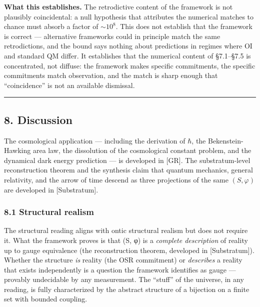 \documentclass[
]{article}
\begin{document}
\textbf{What this establishes.} The retrodictive content of the
framework is not plausibly coincidental: a null hypothesis that
attributes the numerical matches to chance must absorb a factor of
\(\sim 10^8\). This does not establish that the framework is correct ---
alternative frameworks could in principle match the same retrodictions,
and the bound says nothing about predictions in regimes where OI and
standard QM differ. It establishes that the numerical content of
§7.1--§7.5 is concentrated, not diffuse: the framework makes specific
commitments, the specific commitments match observation, and the match
is sharp enough that ``coincidence'' is not an available dismissal.

\begin{center}\rule{0.5\linewidth}{0.5pt}\end{center}

\hypertarget{discussion}{%
\subsection{8. Discussion}\label{discussion}}

The cosmological application --- including the derivation of \(\hbar\),
the Bekenstein-Hawking area law, the dissolution of the cosmological
constant problem, and the dynamical dark energy prediction --- is
developed in {[}GR{]}. The substratum-level reconstruction theorem and
the synthesis claim that quantum mechanics, general relativity, and the
arrow of time descend as three projections of the same \((S, \varphi)\)
are developed in {[}Substratum{]}.

\hypertarget{structural-realism}{%
\subsubsection{8.1 Structural realism}\label{structural-realism}}

The structural reading aligns with ontic structural realism but does not
require it. What the framework proves is that (S, φ) is a \emph{complete
description} of reality up to gauge equivalence (the reconstruction
theorem, developed in {[}Substratum{]}). Whether the structure \emph{is}
reality (the OSR commitment) or \emph{describes} a reality that exists
independently is a question the framework identifies as gauge ---
provably undecidable by any measurement. The ``stuff'' of the universe,
in any reading, is fully characterized by the abstract structure of a
bijection on a finite set with bounded coupling.
\end{document}
